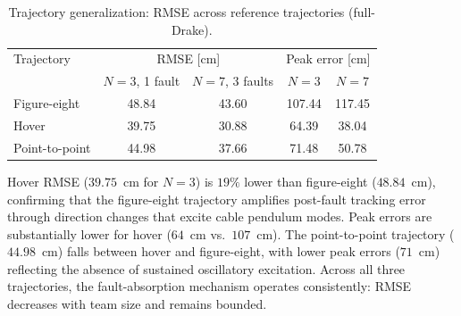 \begin{table}[t]
\centering
\caption{Trajectory generalization: RMSE across reference trajectories (full-Drake).}
\label{tab:trajectory_generalization}
\begin{tabular}{lcccc}
\toprule
Trajectory & \multicolumn{2}{c}{RMSE [cm]} & \multicolumn{2}{c}{Peak error [cm]} \\
           & $N{=}3$, 1 fault & $N{=}7$, 3 faults & $N{=}3$ & $N{=}7$ \\
\midrule
Figure-eight       & 48.84 & 43.60 & 107.44 & 117.45 \\
Hover              & 39.75 & 30.88 & 64.39 & 38.04 \\
Point-to-point     & 44.98 & 37.66 & 71.48 & 50.78 \\
\bottomrule
\end{tabular}
\end{table}

Hover RMSE ($39.75$~cm for $N{=}3$) is $19\%$ lower than figure-eight ($48.84$~cm), confirming that the figure-eight trajectory amplifies post-fault tracking error through direction changes that excite cable pendulum modes. Peak errors are substantially lower for hover ($64$~cm vs.\ $107$~cm). The point-to-point trajectory ($44.98$~cm) falls between hover and figure-eight, with lower peak errors ($71$~cm) reflecting the absence of sustained oscillatory excitation. Across all three trajectories, the fault-absorption mechanism operates consistently: RMSE decreases with team size and remains bounded.
